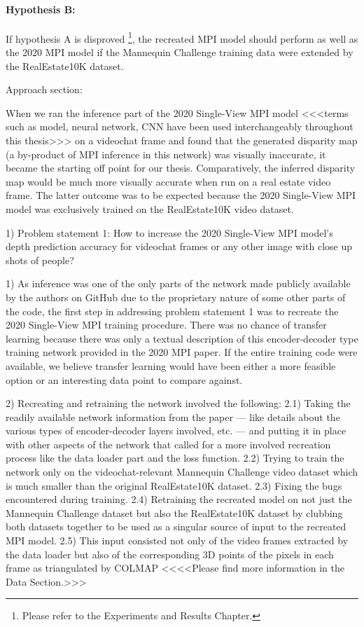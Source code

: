 \paragraph{Hypothesis B:}
If hypothesis A is disproved \footnote{Please refer to the Experiments and Results Chapter.}, the recreated MPI model should perform as well as the 2020 MPI model if the Mannequin Challenge training data were extended by the RealEstate10K dataset.

Approach section:

When we ran the inference part of the 2020 Single-View MPI model <<<terms such as model, neural network, CNN have been used interchangeably throughout this thesis>>> on a videochat frame and found that the generated disparity map (a by-product of MPI inference in this network) was visually inaccurate, it became the starting off point for our thesis. Comparatively, the inferred disparity map would be much more visually accurate when run on a real estate video frame. The latter outcome was to be expected because the 2020 Single-View MPI model was exclusively trained on the RealEstate10K video dataset.   

1) Problem statement 1: How to increase the 2020 Single-View MPI model’s depth prediction accuracy for videochat frames or any other image with close up shots of people? 

1) As inference was one of the only parts of the network made publicly available by the authors on GitHub due to the proprietary nature of some other parts of the code, the first step in addressing problem statement 1 was to recreate the 2020 Single-View MPI training procedure. There was no chance of transfer learning because there was only a textual description of this encoder-decoder type training network provided in the 2020 MPI paper. If the entire training code were available, we believe transfer learning would have been either a more feasible option or an interesting data point to compare against. 

2) Recreating and retraining the network involved the following:
    2.1) Taking the readily available network information from the paper --- like details about the various types of encoder-decoder layers involved, etc. --- and putting it in place with other aspects of the network that called for a more involved recreation process like the data loader part and the loss function.
    2.2) Trying to train the network only on the videochat-relevant Mannequin Challenge video dataset which is much smaller than the original RealEstate10K dataset.
    2.3) Fixing the bugs encountered during training.
    2.4) Retraining the recreated model on not just the Mannequin Challenge dataset but also the RealEstate10K dataset by clubbing both datasets together to be used as a singular source of input to the recreated MPI model.
    2.5) This input consisted not only of the video frames extracted by the data loader but also of the corresponding 3D points of the pixels in each frame as triangulated by COLMAP <<<<Please find more information in the Data Section.>>> 

